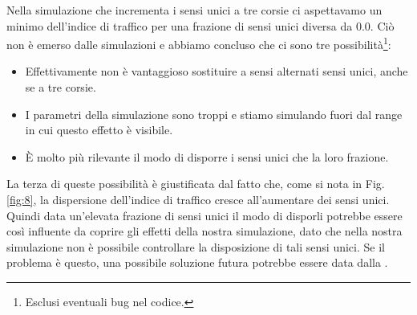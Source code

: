\documentclass[main.tex]{subfiles}
\begin{document}
    Nella simulazione che incrementa i sensi unici a tre corsie ci aspettavamo un minimo dell'indice di traffico per una frazione di sensi unici diversa da 0.0.
    Ciò non è emerso dalle simulazioni e abbiamo concluso che ci sono tre possibilità\footnote{Esclusi eventuali bug nel codice.}:
    \begin{itemize}
        \item Effettivamente non è vantaggioso sostituire a sensi alternati sensi unici, anche se a tre corsie.
        \item I parametri della simulazione sono troppi e stiamo simulando fuori dal range in cui questo effetto è visibile.
        \item \`{E} molto più rilevante il modo di disporre i sensi unici che la loro frazione.
    \end{itemize}

    La terza di queste possibilità è giustificata dal fatto che, come si nota in Fig. \ref{fig:8}, la dispersione dell'indice di traffico cresce all'aumentare dei
    sensi unici. Quindi data un'elevata frazione di sensi unici il modo di disporli potrebbe essere così influente da coprire gli effetti della nostra simulazione,
    dato che nella nostra simulazione non è possibile controllare la disposizione di tali sensi unici.
    Se il problema è questo, una possibile soluzione futura potrebbe essere data dalla .
\end{document}
